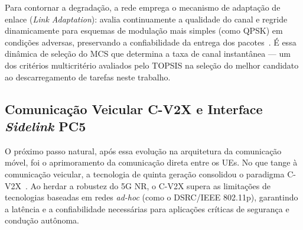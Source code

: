 

Para contornar a degradação, a rede emprega o mecanismo de adaptação de enlace (\textit{Link Adaptation}): avalia continuamente a qualidade do canal e regride dinamicamente para esquemas de modulação mais simples (como QPSK) em condições adversas, preservando a confiabilidade da entrega dos pacotes~\cite{cox2025, stallings2021}. É essa dinâmica de seleção do \gls{MCS} que determina a taxa de canal instantânea --- um dos critérios multicritério avaliados pelo \gls{TOPSIS} na seleção do melhor candidato ao descarregamento de tarefas neste trabalho.

\subsection{Comunicação Veicular \texorpdfstring{\gls{C-V2X}}{C-\gls{V2X}} e Interface \textit{Sidelink} \texorpdfstring{\gls{PC5}}{PC5}}
\label{subsec:cv2x-sidelink}

O próximo passo natural, após essa evolução na arquitetura da comunicação móvel, foi o aprimoramento da comunicação direta entre os \glspl{UE}. No que tange à comunicação veicular, a tecnologia de quinta geração consolidou o paradigma \gls{C-V2X}~\cite{garcia2021}. Ao herdar a robustez do \gls{5G} \gls{NR}, o \gls{C-V2X} supera as limitações de tecnologias baseadas em redes \textit{ad-hoc} (como o \gls{DSRC/IEEE} 802.11p), garantindo a latência e a confiabilidade necessárias para aplicações críticas de segurança e condução autônoma.

